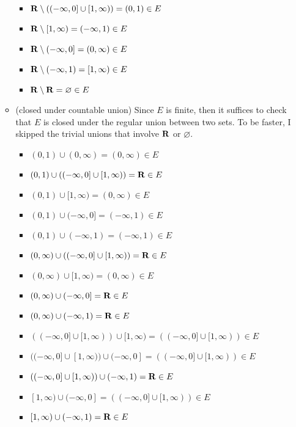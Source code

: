 \begin{solution}
\begin{itemize}
\begin{itemize}
\begin{itemize}
                \item $\mathbf{R} \setminus ((-\infty, 0]\cup[1, \infty)) = (0,1) \in E$
                \item $\mathbf{R} \setminus [1, \infty) = (-\infty,1) \in E$
                \item $\mathbf{R} \setminus (-\infty, 0] = (0,\infty) \in E$
                \item $\mathbf{R} \setminus (-\infty, 1) = [1,\infty) \in E$
                \item $\mathbf{R} \setminus \mathbf{R} = \varnothing \in E$
            \end{itemize}
            \item (closed under countable union) Since $E$ is finite, then it suffices to check that $E$ is closed under the regular union between two sets. To be faster, I skipped the trivial unions that involve $\mathbf{R}$ or $\varnothing$.
            \begin{itemize}
                \item $(0,1)\cup(0, \infty) = (0, \infty) \in E$
                \item $(0, 1) \cup ((-\infty, 0]\cup[1, \infty)) = \mathbf{R} \in E$
                \item $(0, 1) \cup [1, \infty) = (0, \infty) \in E$
                \item $(0, 1) \cup (-\infty, 0] = (-\infty, 1) \in E$
                \item $(0, 1) \cup (-\infty, 1) = (-\infty, 1) \in E$
                \item $(0, \infty) \cup ((-\infty, 0]\cup[1, \infty)) = \mathbf{R} \in E$
                \item $(0, \infty) \cup [1, \infty) = (0, \infty) \in E$
                \item $(0, \infty) \cup (-\infty, 0] = \mathbf{R} \in E$
                \item $(0, \infty) \cup (-\infty, 1) = \mathbf{R} \in E$
                \item $((-\infty, 0]\cup[1, \infty)) \cup [1, \infty) = ((-\infty, 0]\cup[1, \infty)) \in E$
                \item $((-\infty, 0]\cup[1, \infty))\cup (-\infty, 0] = ((-\infty, 0]\cup[1, \infty)) \in E$
                \item $((-\infty, 0]\cup[1, \infty)) \cup (-\infty, 1) = \mathbf{R} \in E$
                \item $[1, \infty)\cup (-\infty, 0] = ((-\infty, 0]\cup[1, \infty)) \in E$
                \item $[1, \infty) \cup (-\infty, 1) = \mathbf{R} \in E$

\end{itemize}
\end{itemize}
\end{itemize}
\end{solution}
